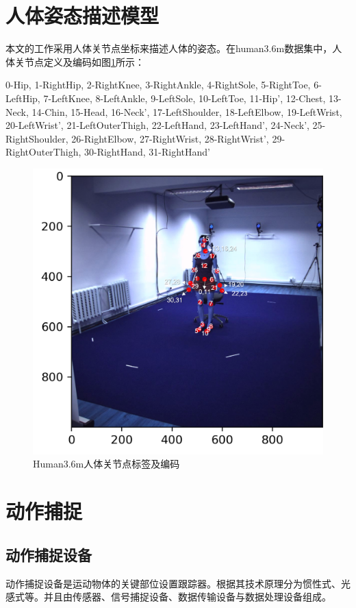 \section{人体姿态描述模型}
本文的工作采用人体关节点坐标来描述人体的姿态。在human3.6m数据集中，人体关节点定义及编码如图\ref{fig:f12}所示：

0-Hip, 1-RightHip, 2-RightKnee, 3-RightAnkle, 4-RightSole, 5-RightToe, 6-LeftHip, 7-LeftKnee, 8-LeftAnkle, 9-LeftSole, 10-LeftToe, 11-Hip’, 12-Chest, 13-Neck, 14-Chin, 15-Head, 16-Neck’, 17-LeftShoulder, 18-LeftElbow, 19-LeftWrist, 20-LeftWrist’, 21-LeftOuterThigh, 22-LeftHand, 23-LeftHand’, 24-Neck’, 25-RightShoulder, 26-RightElbow, 27-RightWrist, 28-RightWrist’, 29-RightOuterThigh, 30-RightHand, 31-RightHand’

\begin{figure}[h]
	\centering
	\includegraphics[scale=0.4]{figures/12.png}
	\caption{Human3.6m人体关节点标签及编码}
	\label{fig:f12}
\end{figure}


\section{动作捕捉}

\subsection{动作捕捉设备}{}
动作捕捉设备是运动物体的关键部位设置跟踪器。根据其技术原理分为惯性式、光感式等。并且由传感器、信号捕捉设备、数据传输设备与数据处理设备组成。

